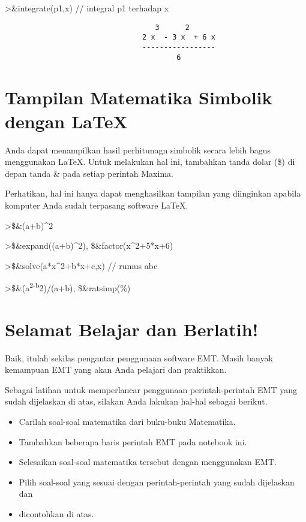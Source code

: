 \documentclass[
]{book}
\begin{document}
\textgreater\&integrate(p1,x) // integral p1 terhadap x

\begin{verbatim}
                                   3      2
                                2 x  - 3 x  + 6 x
                                -----------------
                                        6
\end{verbatim}

\chapter{Tampilan Matematika Simbolik dengan LaTeX}\label{tampilan-matematika-simbolik-dengan-latex}

Anda dapat menampilkan hasil perhitunagn simbolik secara lebih bagus menggunakan LaTeX. Untuk melakukan hal ini, tambahkan tanda dolar (\$) di depan tanda \& pada setiap perintah Maxima.

Perhatikan, hal ini hanya dapat menghasilkan tampilan yang diinginkan apabila komputer Anda sudah terpasang software LaTeX.

\textgreater\$\&(a+b)\^{}2

\textgreater\$\&expand((a+b)\^{}2), \$\&factor(x\^{}2+5*x+6)

\textgreater\$\&solve(a*x\^{}2+b*x+c,x) // rumus abc

\textgreater\$\&(a\textsuperscript{2-b}2)/(a+b), \$\&ratsimp(\%)

\chapter{Selamat Belajar dan Berlatih!}\label{selamat-belajar-dan-berlatih}

Baik, itulah sekilas pengantar penggunaan software EMT. Masih banyak kemampuan EMT yang akan Anda pelajari dan praktikkan.

Sebagai latihan untuk memperlancar penggunaan perintah-perintah EMT yang sudah dijelaskan di atas, silakan Anda lakukan hal-hal sebagai berikut.

\begin{itemize}
\item
  Carilah soal-soal matematika dari buku-buku Matematika.
\item
  Tambahkan beberapa baris perintah EMT pada notebook ini.
\item
  Selesaikan soal-soal matematika tersebut dengan menggunakan EMT.
\item
  Pilih soal-soal yang sesuai dengan perintah-perintah yang sudah dijelaskan dan
\item
  dicontohkan di atas.
\end{itemize}
\end{document}
